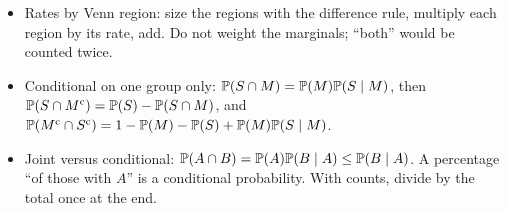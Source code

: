\begin{itemize}[leftmargin=2em]
  law of total probability, $\Prob(A) = \sum_i \Prob(B_i)\Prob(A \mid B_i)$ (outcome (g)).
  \item Rates by Venn region: size the regions with the difference rule, multiply each region by
  its rate, add. Do not weight the marginals; ``both'' would be counted twice.
  \item Conditional on one group only: $\mathbb{P}(S \cap M) = \mathbb{P}(M)\mathbb{P}(S \mid M)$, then
  $\mathbb{P}(S \cap M^{\mathrm{c}}) = \mathbb{P}(S) - \mathbb{P}(S \cap M)$, and
  $\mathbb{P}(M^{\mathrm{c}} \cap S^{\mathrm{c}}) = 1 - \mathbb{P}(M) - \mathbb{P}(S) + \mathbb{P}(M)\mathbb{P}(S \mid M)$.
  \item Joint versus conditional: $\mathbb{P}(A \cap B) = \mathbb{P}(A)\mathbb{P}(B \mid A) \le \mathbb{P}(B \mid A)$.
  A percentage ``of those with $A$'' is a conditional probability. With counts, divide by the
  total once at the end.
\end{itemize}
